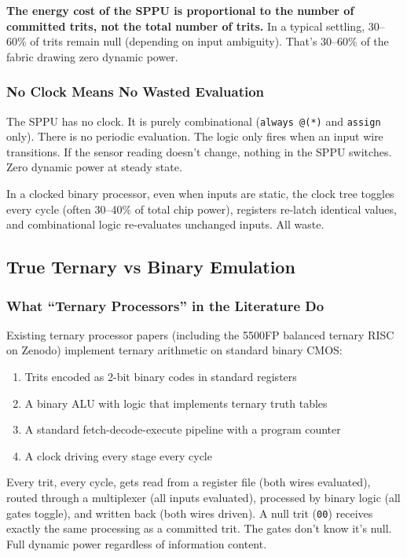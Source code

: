 \documentclass[11pt,a4paper]{article}
\begin{document}
\textbf{The energy cost of the SPPU is proportional to the number of committed trits, not the total number of trits.} In a typical settling, 30--60\% of trits remain null (depending on input ambiguity). That's 30--60\% of the fabric drawing zero dynamic power.

\subsubsection{No Clock Means No Wasted Evaluation}

The SPPU has no clock. It is purely combinational (\texttt{always @(*)} and \texttt{assign} only). There is no periodic evaluation. The logic only fires when an input wire transitions. If the sensor reading doesn't change, nothing in the SPPU switches. Zero dynamic power at steady state.

In a clocked binary processor, even when inputs are static, the clock tree toggles every cycle (often 30--40\% of total chip power), registers re-latch identical values, and combinational logic re-evaluates unchanged inputs. All waste.

\subsection{True Ternary vs Binary Emulation}

\subsubsection{What ``Ternary Processors'' in the Literature Do}

Existing ternary processor papers (including the 5500FP balanced ternary RISC on Zenodo) implement ternary arithmetic on standard binary CMOS:

\begin{enumerate}
    \item Trits encoded as 2-bit binary codes in standard registers
    \item A binary ALU with logic that implements ternary truth tables
    \item A standard fetch-decode-execute pipeline with a program counter
    \item A clock driving every stage every cycle
\end{enumerate}

Every trit, every cycle, gets read from a register file (both wires evaluated), routed through a multiplexer (all inputs evaluated), processed by binary logic (all gates toggle), and written back (both wires driven). A null trit (\texttt{00}) receives exactly the same processing as a committed trit. The gates don't know it's null. Full dynamic power regardless of information content.
\end{document}
